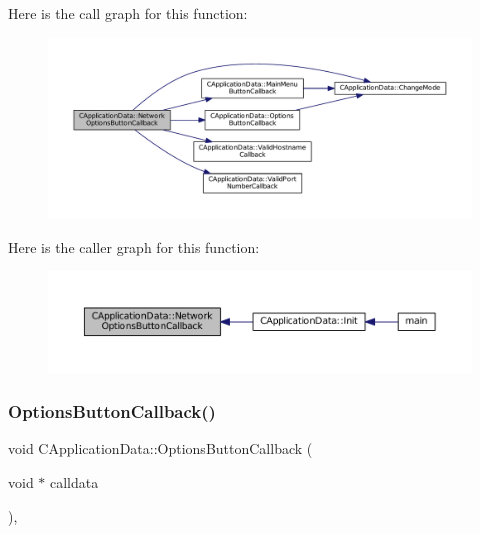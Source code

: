 Here is the call graph for this function\+:\nopagebreak
\begin{figure}[H]
\begin{center}
\leavevmode
\includegraphics[width=350pt]{classCApplicationData_ad41dbc2f54ee638aa64a1d0c22b3fba9_cgraph}
\end{center}
\end{figure}
Here is the caller graph for this function\+:\nopagebreak
\begin{figure}[H]
\begin{center}
\leavevmode
\includegraphics[width=350pt]{classCApplicationData_ad41dbc2f54ee638aa64a1d0c22b3fba9_icgraph}
\end{center}
\end{figure}
\hypertarget{classCApplicationData_a3647cf78eb59689b901d4204c81555b4}{}\label{classCApplicationData_a3647cf78eb59689b901d4204c81555b4} 
\subsubsection{\texorpdfstring{Options\+Button\+Callback()}{OptionsButtonCallback()}}
{\footnotesize\ttfamily void C\+Application\+Data\+::\+Options\+Button\+Callback (\begin{DoxyParamCaption}\item[{void $\ast$}]{calldata }\end{DoxyParamCaption})\hspace{0.3cm}{\ttfamily [static]}, {\ttfamily [protected]}}



